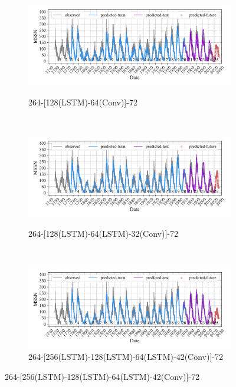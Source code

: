 \begin{figure}[!htbp]
  \centering
  \begin{subfigure}[b]{1.0\textwidth}
    \caption{264-[128(LSTM)-64(Conv)]-72} 
    \vspace{-0.35cm}
    \includegraphics[width=\textwidth]{Img/chap3_ss/ssn_series_in_264_out_72_layer_3_layersize_128_lstm_cnn.pdf}
    \label{fig:ssn_series_in_264_out_72_layer_3_layersize_128_lstm_cnn}
  \end{subfigure}    \\
  \vspace{-1cm}
  \begin{subfigure}[b]{1.0\textwidth}
    \caption{264-[128(LSTM)-64(LSTM)-32(Conv)]-72}
    \vspace{-0.35cm}
    \includegraphics[width=\textwidth]{Img/chap3_ss/ssn_series_in_264_out_72_layer_4_layersize_128_lstm_cnn.pdf}
    \label{fig:ssn_series_in_264_out_72_layer_4_layersize_128_lstm_cnn}
  \end{subfigure} \\
  \vspace{-1cm}
  \begin{subfigure}[b]{1.0\textwidth}
    \caption{264-[256(LSTM)-128(LSTM)-64(LSTM)-42(Conv)]-72}
    \vspace{-0.35cm}
    \includegraphics[width=\textwidth]{Img/chap3_ss/ssn_series_in_264_out_72_layer_5_layersize_256_lstm_cnn.pdf}

\end{subfigure}
\end{figure}
